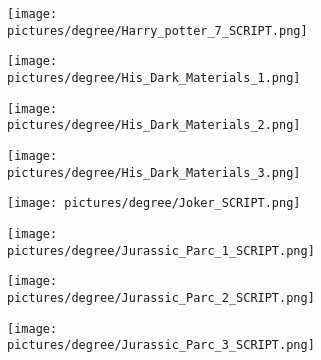 \begin{figure} \ContinuedFloat
        \centering
        \begin{subfigure}{.49\textwidth}
                \centering
                \texttt{[image: pictures/degree/Harry\_potter\_7\_SCRIPT.png]}
        \end{subfigure}
        \begin{subfigure}{.49\textwidth}
                \centering
                \texttt{[image: pictures/degree/His\_Dark\_Materials\_1.png]}
        \end{subfigure}
\end{figure}
\begin{figure} \ContinuedFloat
        \centering
        \begin{subfigure}{.49\textwidth}
                \centering
                \texttt{[image: pictures/degree/His\_Dark\_Materials\_2.png]}
        \end{subfigure}
        \begin{subfigure}{.49\textwidth}
                \centering
                \texttt{[image: pictures/degree/His\_Dark\_Materials\_3.png]}
        \end{subfigure}
\end{figure}
\begin{figure} \ContinuedFloat
        \centering
        \begin{subfigure}{.49\textwidth}
                \centering
                \texttt{[image: pictures/degree/Joker\_SCRIPT.png]}
        \end{subfigure}
        \begin{subfigure}{.49\textwidth}
                \centering
                \texttt{[image: pictures/degree/Jurassic\_Parc\_1\_SCRIPT.png]}
        \end{subfigure}
\end{figure}
\begin{figure} \ContinuedFloat
        \centering
        \begin{subfigure}{.49\textwidth}
                \centering
                \texttt{[image: pictures/degree/Jurassic\_Parc\_2\_SCRIPT.png]}
        \end{subfigure}
        \begin{subfigure}{.49\textwidth}
                \centering
                \texttt{[image: pictures/degree/Jurassic\_Parc\_3\_SCRIPT.png]}
        \end{subfigure}
\end{figure}
